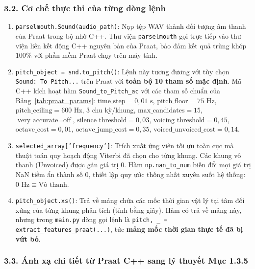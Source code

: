 \documentclass[11pt,a4paper]{article}
\begin{document}
\subsubsection*{3.2. Cơ chế thực thi của từng dòng lệnh}
\begin{enumerate}
    \setlength{\itemsep}{1.5pt}
    \item \texttt{parselmouth.Sound(audio\_path)}: Nạp tệp WAV thành đối tượng âm thanh của Praat trong bộ nhớ C++. Thư viện \texttt{parselmouth} gọi trực tiếp vào thư viện liên kết động C++ nguyên bản của Praat, bảo đảm kết quả trùng khớp $100\%$ với phần mềm Praat chạy trên máy tính.
    \item \texttt{pitch\_object = snd.to\_pitch()}: Lệnh này tương đương với tùy chọn \texttt{Sound: To Pitch...} trên Praat với \textbf{toàn bộ 10 tham số mặc định}. Mã C++ kích hoạt hàm \texttt{Sound\_to\_Pitch\_ac} với các tham số chuẩn của Bảng~\ref{tab:praat_params}: $\text{time\_step} = 0{,}01\text{ s}$, $\text{pitch\_floor} = 75\text{ Hz}$, $\text{pitch\_ceiling} = 600\text{ Hz}$, 3 chu kỳ/khung, $\text{max\_candidates} = 15$, $\text{very\_accurate} = \text{off}$, $\text{silence\_threshold} = 0{,}03$, $\text{voicing\_threshold} = 0{,}45$, $\text{octave\_cost} = 0{,}01$, $\text{octave\_jump\_cost} = 0{,}35$, $\text{voiced\_unvoiced\_cost} = 0{,}14$.
    \item \texttt{selected\_array['frequency']}: Trích xuất ứng viên tối ưu toàn cục mà thuật toán quy hoạch động Viterbi đã chọn cho từng khung. Các khung vô thanh (Unvoiced) được gán giá trị $0$. Hàm \texttt{np.nan\_to\_num} biến đổi mọi giá trị NaN tiềm ẩn thành số $0$, thiết lập quy ước thống nhất xuyên suốt hệ thống: \textbf{$0\text{ Hz} \equiv \text{Vô thanh}$}.
    \item \texttt{pitch\_object.xs()}: Trả về mảng chứa các mốc thời gian vật lý tại tâm đối xứng của từng khung phân tích (tính bằng giây). Hàm có trả về mảng này, nhưng trong \texttt{main.py} dòng gọi lệnh là \texttt{pitch, \_ = extract\_features\_praat(...)}, tức \textbf{mảng mốc thời gian thực tế đã bị vứt bỏ}.
\end{enumerate}

\subsubsection*{3.3. Ánh xạ chi tiết từ Praat C++ sang lý thuyết Mục 1.3.5}
\end{document}

